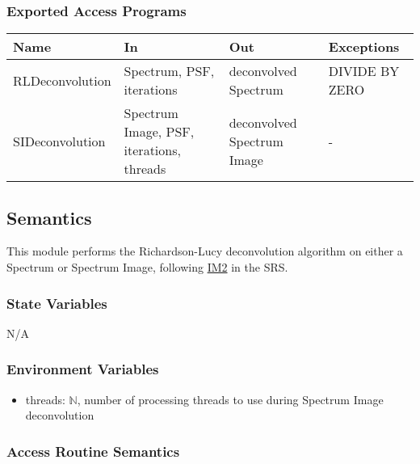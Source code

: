 \documentclass[12pt, titlepage]{article}
\begin{document}
\subsubsection{Exported Access Programs}

\begin{center}
\begin{tabular}{p{4cm} p{4cm} p{4cm} p{2cm}}
\hline
\textbf{Name} & \textbf{In} & \textbf{Out} & \textbf{Exceptions} \\
\hline
RLDeconvolution & Spectrum, PSF, iterations & deconvolved Spectrum & DIVIDE BY ZERO \\
SIDeconvolution & Spectrum Image, PSF, iterations, threads & deconvolved Spectrum Image & - \\
\hline
\end{tabular}
\end{center}

\subsection{Semantics}
This module performs the Richardson-Lucy deconvolution algorithm on either a Spectrum or Spectrum Image, following \hyperref[deconvolution]{IM2} in the SRS.

\subsubsection{State Variables}
N/A

\subsubsection{Environment Variables}
\begin{itemize}
    \item threads: $\mathbb{N}$, number of processing threads to use during Spectrum Image deconvolution
\end{itemize}

\subsubsection{Access Routine Semantics}
\end{document}

